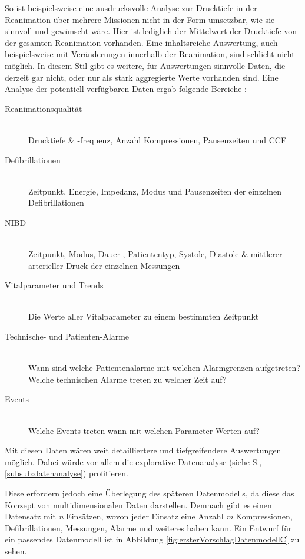 So ist beispielsweise eine ausdrucksvolle Analyse zur Drucktiefe in der Reanimation über mehrere Missionen nicht in der Form umsetzbar, wie sie sinnvoll und gewünscht wäre.
Hier ist lediglich der Mittelwert der Drucktiefe von der gesamten Reanimation vorhanden.
Eine inhaltsreiche Auswertung, auch beispielsweise mit Veränderungen innerhalb der Reanimation, sind schlicht nicht möglich.
In diesem Stil gibt es weitere, für Auswertungen sinnvolle Daten, die derzeit gar nicht, oder nur als stark aggregierte Werte vorhanden sind.
Eine Analyse der potentiell verfügbaren Daten ergab folgende Bereiche
:  %
\begin{description}
\item [Reanimationsqualität]\hfill \\
Drucktiefe \& -frequenz, Anzahl Kompressionen, Pausenzeiten und \gls{CCF}
\item [Defibrillationen]\hfill \\
Zeitpunkt, Energie, Impedanz, Modus und Pausenzeiten der einzelnen Defibrillationen
\item [\gls{NIBD}]\hfill \\
Zeitpunkt, Modus, Dauer , Patiententyp, Systole, Diastole \& mittlerer arterieller Druck der einzelnen Messungen
\item [Vitalparameter und Trends]\hfill \\
Die Werte aller Vitalparameter zu einem bestimmten Zeitpunkt
\item [Technische- und Patienten-Alarme]\hfill \\
Wann sind welche Patientenalarme mit welchen Alarmgrenzen aufgetreten? \\
Welche technischen Alarme treten zu welcher Zeit auf?
\item [Events]\hfill \\
Welche Events treten wann mit welchen Parameter-Werten auf?
\end{description}

Mit diesen Daten wären weit detailliertere und tiefgreifendere Auswertungen möglich. 
Dabei würde vor allem die explorative Datenanalyse (siehe S.\pageref{subsub:datenanalyse}, \ref{subsub:datenanalyse}) profitieren.

Diese erfordern jedoch eine Überlegung des späteren Datenmodells, da diese das Konzept von multidimensionalen Daten darstellen.
Demnach gibt es einen Datensatz mit \textit{n} Einsätzen, wovon jeder Einsatz eine Anzahl \textit{m} Kompressionen, Defibrillationen, Messungen, Alarme und weiteres haben kann.
Ein Entwurf für ein passendes Datenmodell ist in Abbildung \ref{fig:ersterVorschlagDatenmodellC} zu sehen.

